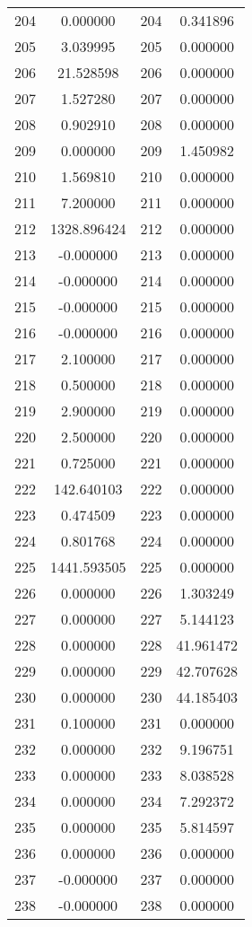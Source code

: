 \documentclass[12pt]{article}
\begin{document}
\begin{longtable}{@{}cccc@{}}
204 & 0.000000 & 204 & 0.341896 \\
205 & 3.039995 & 205 & 0.000000 \\
206 & 21.528598 & 206 & 0.000000 \\
207 & 1.527280 & 207 & 0.000000 \\
208 & 0.902910 & 208 & 0.000000 \\
209 & 0.000000 & 209 & 1.450982 \\
210 & 1.569810 & 210 & 0.000000 \\
211 & 7.200000 & 211 & 0.000000 \\
212 & 1328.896424 & 212 & 0.000000 \\
213 & -0.000000 & 213 & 0.000000 \\
214 & -0.000000 & 214 & 0.000000 \\
215 & -0.000000 & 215 & 0.000000 \\
216 & -0.000000 & 216 & 0.000000 \\
217 & 2.100000 & 217 & 0.000000 \\
218 & 0.500000 & 218 & 0.000000 \\
219 & 2.900000 & 219 & 0.000000 \\
220 & 2.500000 & 220 & 0.000000 \\
221 & 0.725000 & 221 & 0.000000 \\
222 & 142.640103 & 222 & 0.000000 \\
223 & 0.474509 & 223 & 0.000000 \\
224 & 0.801768 & 224 & 0.000000 \\
225 & 1441.593505 & 225 & 0.000000 \\
226 & 0.000000 & 226 & 1.303249 \\
227 & 0.000000 & 227 & 5.144123 \\
228 & 0.000000 & 228 & 41.961472 \\
229 & 0.000000 & 229 & 42.707628 \\
230 & 0.000000 & 230 & 44.185403 \\
231 & 0.100000 & 231 & 0.000000 \\
232 & 0.000000 & 232 & 9.196751 \\
233 & 0.000000 & 233 & 8.038528 \\
234 & 0.000000 & 234 & 7.292372 \\
235 & 0.000000 & 235 & 5.814597 \\
236 & 0.000000 & 236 & 0.000000 \\
237 & -0.000000 & 237 & 0.000000 \\
238 & -0.000000 & 238 & 0.000000 \\

\end{longtable}
\end{document}
